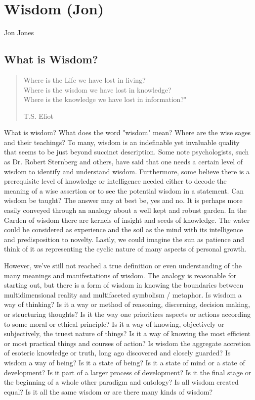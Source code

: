 \chapter{Wisdom (Jon)}

\begin{authors}
	Jon Jones
\end{authors}

\section{What is Wisdom?}

\begin{quote}
Where is the Life we have lost in living?\\
Where is the wisdom we have lost in knowledge?\\
Where is the knowledge we have lost in information?"\\
\begin{flushright}
	T.S. Eliot
\end{flushright}
\end{quote}

What is wisdom? What does the word "wisdom" mean? Where are the wise sages and their teachings? To many, wisdom is an indefinable yet invaluable quality that seems to be just beyond succinct description. Some note psychologists, such as Dr. Robert Sternberg and others, have said that one needs a certain level of wisdom to identify and understand wisdom. Furthermore, some believe there is a prerequisite level of knowledge or intelligence needed either to decode the meaning of a wise assertion or to see the potential wisdom in a statement. Can wisdom be taught? The answer may at best be, yes and no. It is perhaps more easily conveyed through an analogy about a well kept and robust garden. In the Garden of wisdom there are kernels of insight and seeds of knowledge. The water could be considered as experience and the soil as the mind with its intelligence and predisposition to novelty. Lastly, we could imagine the sun as patience and think of it as representing the cyclic nature of many aspects of personal growth.

However, we've still not reached a true definition or even understanding of the many meanings and manifestations of wisdom. The analogy is reasonable for starting out, but there is a form of wisdom in knowing the boundaries between multidimensional reality and multifaceted symbolism / metaphor. Is wisdom a way of thinking? Is it a way or method of reasoning, discerning, decision making, or structuring thoughts? Is it the way one prioritizes aspects or actions according to some moral or ethical principle? Is it a way of knowing, objectively or subjectively, the truest nature of things? Is it a way of knowing the most efficient or most practical things and courses of action? Is wisdom the aggregate accretion of esoteric knowledge or truth, long ago discovered and closely guarded? Is wisdom a way of being? Is it a state of being? Is it a state of mind or a state of development? Is it part of a larger process of development? Is it the final stage or the beginning of a whole other paradigm and ontology? Is all wisdom created equal? Is it all the same wisdom or are there many kinds of wisdom?

